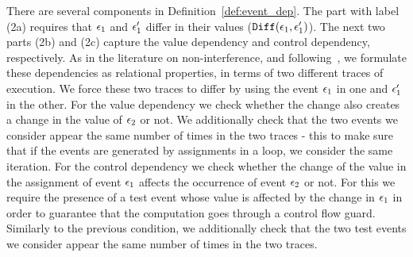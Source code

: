 There are several components in Definition~\ref{def:event_dep}. The part with label (2a) requires that $\mathtt{\epsilon}_1$ and $\mathtt{\epsilon}_1'$ differ in their values ($\mathtt{Diff}(\mathtt{\epsilon}_1, \mathtt{\epsilon}_1')$).
The next two parts (2b) and (2c) capture the value dependency and control dependency, respectively.
As in the literature on non-interference, and following~\cite{Cousot19a}, we formulate these dependencies as relational properties, in terms of two different traces of execution. 
We force these two traces to differ by using the event $\mathtt{\epsilon}_1$ in one and $\mathtt{\epsilon}_1'$ in the other. 
For the value dependency we check whether the change also creates a change in the value of $\mathtt{\epsilon}_2$ or not. We additionally check that the two events we consider appear the same number of times in the two traces - this to make sure that if the events are generated by assignments in a loop, we consider the same iteration. 
For the control dependency we check whether the change of the value in the assignment of event $\mathtt{\epsilon}_1$ affects the occurrence of event $\mathtt{\epsilon}_2$ or not. 
For this we require the presence of a test event whose value is affected by the change in $\mathtt{\epsilon}_1$
in order to guarantee that the computation goes through a control flow guard.
Similarly to the previous condition, we additionally check that the two test events we consider appear the same number of times in the two traces.
% 
